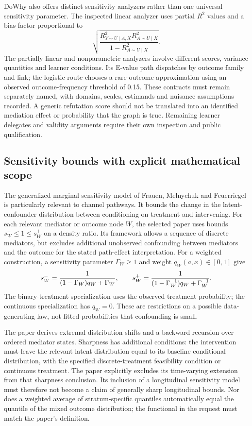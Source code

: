 DoWhy also offers distinct sensitivity analyzers rather than one universal sensitivity parameter. The inspected linear analyzer uses partial $R^2$ values and a bias factor proportional to
\[
 \sqrt{\frac{R^2_{Y\sim U\mid A,X}R^2_{A\sim U\mid X}}
 {1-R^2_{A\sim U\mid X}}}.
\]
The partially linear and nonparametric analyzers involve different scores, variance quantities and learner conditions. Its E-value path dispatches by outcome family and link; the logistic route chooses a rare-outcome approximation using an observed outcome-frequency threshold of 0.15. These contracts must remain separately named, with domains, scales, estimands and nuisance assumptions recorded. A generic refutation score should not be translated into an identified mediation effect or probability that the graph is true. Remaining learner delegates and validity arguments require their own inspection and public qualification.\cite{exec25_pymed_dowhy,exec25_pymed_choice}

\subsection{Sensitivity bounds with explicit mathematical scope}
The generalized marginal sensitivity model of Frauen, Melnychuk and Feuerriegel is particularly relevant to channel pathways. It bounds the change in the latent-confounder distribution between conditioning on treatment and intervening. For each relevant mediator or outcome node $W$, the selected paper uses bounds $s_W^-\leq1\leq s_W^+$ on a density ratio. Its framework allows a sequence of discrete mediators, but excludes additional unobserved confounding between mediators and the outcome for the stated path-effect interpretation. For a weighted construction, a sensitivity parameter $\Gamma_W\geq1$ and weight $q_W(a,x)\in[0,1]$ give
\[
 s_W^-={1\over(1-\Gamma_W)q_W+\Gamma_W},\qquad
 s_W^+={1\over(1-\Gamma_W^{-1})q_W+\Gamma_W^{-1}}.
\]
The binary-treatment specialization uses the observed treatment probability; the continuous specialization has $q_W=0$. These are restrictions on a possible data-generating law, not fitted probabilities that confounding is small.\cite{exec25_pymed_sharp_paper}

The paper derives extremal distribution shifts and a backward recursion over ordered mediator states. Sharpness has additional conditions: the intervention must leave the relevant latent distribution equal to its baseline conditional distribution, with the specified discrete-treatment feasibility condition or continuous treatment. The paper explicitly excludes its time-varying extension from that sharpness conclusion. Its inclusion of a longitudinal sensitivity model must therefore not become a claim of generally sharp longitudinal bounds. Nor does a weighted average of stratum-specific quantiles automatically equal the quantile of the mixed outcome distribution; the functional in the request must match the paper's definition.\cite{exec25_pymed_sharp_paper}

